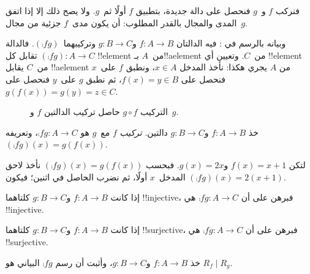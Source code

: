 \documentclass[../../../include/open-logic-section]{subfiles}
\begin{document}

\begin{explain}
فنركب $f$ و~$g$ فنحصل على دالة جديدة، بتطبيق $f$
أولًا ثم~$g$. ولا يصح ذلك إلا إذا اتفق المدى والمجال بالقدر المطلوب:
أن يكون مدى~$f$ جزئية من مجال~$g$.

وبيانه بالرسم في : فيه الدالتان
$f \colon A \to B$ و$g \colon B \to C$ وتركيبهما~$(\comp{f}{g})$.
فالدالة $(\comp{f}{g}) \colon A \to C$ تقابل كل !!{element}
من~$A$ بـ!!a{element} من~$C$. وتعيين أي !!{element} من~$C$
يقابل !!a{element} من $A$ يجري هكذا: نأخذ المدخل $x \in A$،
ونطبق $f$ على~$x$ فنحصل على $f(x) = y \in B$، ثم نطبق $g$
على~$y$ فنحصل على $g(f(x)) = g(y) = z \in C$.
\begin{figure}
  \caption{التركيب $g \circ f$ حاصل تركيب الدالتين $f$ و~$g$.}
\end{figure}
\end{explain}

\begin{defn}[التركيب]
خذ $f\colon A \to B$ و$g\colon B \to C$ دالتين.
\emph{تركيب} $f$ مع~$g$ هو $\comp{f}{g} \colon A \to C$،
وتعريفه $(\comp{f}{g})(x) = g(f(x))$.
\end{defn}

\begin{ex}
لتكن $f(x) = x + 1$ و$g(x) = 2x$. فبحسب
$(\comp{f}{g})(x) = g(f(x))$ نأخذ لاحق المدخل~$x$ أولًا،
ثم نضرب الحاصل في اثنين؛ فيكون $(\comp{f}{g})(x) = 2(x+1)$.
\end{ex}

\begin{prob}
إذا كانت $f \colon A \to B$ و$g \colon B \to C$ كلتاهما !!{injective}،
فبرهن على أن $\comp{f}{g}\colon A \to C$ هي !!{injective}.
\end{prob}

\begin{prob}
إذا كانت $f \colon A \to B$ و$g \colon B \to C$ كلتاهما !!{surjective}،
فبرهن على أن $\comp{f}{g}\colon A \to C$ هي !!{surjective}.
\end{prob}

\begin{prob}
خذ $f \colon A \to B$ و$g \colon B \to C$، وأثبت أن رسم
$\comp{f}{g}$ البياني هو $R_f \mid R_g$.
\end{prob}
\end{document}
